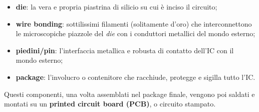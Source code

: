 \documentclass[openany,a4paper,12pt]{book}
\begin{document}
\begin{itemize}[label=\textcolor{PoliBlue}{\textbullet}]
    \item \textbf{die}: la vera e propria piastrina di silicio su cui è inciso il circuito;
    \item \textbf{wire bonding}: sottilissimi filamenti (solitamente d'oro) che interconnettono le microscopiche piazzole del \textit{die} con i conduttori metallici del mondo esterno;
    \item \textbf{piedini/pin}: l'interfaccia metallica e robusta di contatto dell'IC con il mondo esterno;
    \item \textbf{package}: l'involucro o contenitore che racchiude, protegge e sigilla tutto l'IC.
\end{itemize}

Questi componenti, una volta assemblati nel package finale, vengono poi saldati e montati su un \textbf{printed circuit board (PCB)}, o circuito stampato.

\vspace{0.5cm}
\end{document}
